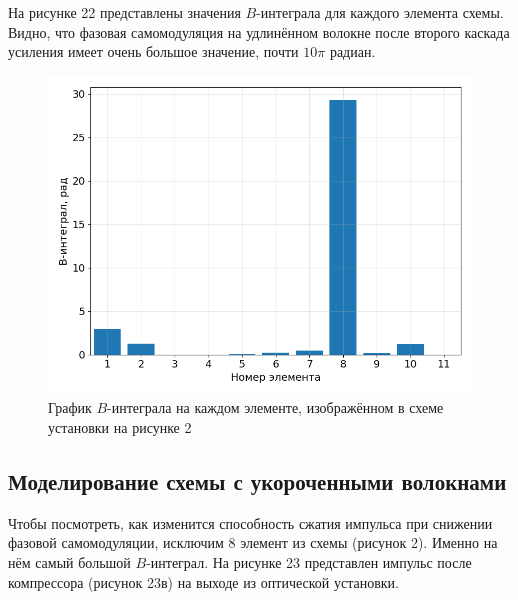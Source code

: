 \documentclass[12pt]{article}
\begin{document}
На рисунке 22 представлены значения $B$-интеграла для каждого элемента схемы. Видно, что фазовая самомодуляция
на удлинённом волокне после второго каскада усиления имеет очень большое значение, почти $10\pi$ радиан.

\begin{figure}[h!]
    \centering
    \begin{minipage}[b]{0.5\textwidth}
        \includegraphics[width=\textwidth]{Images/Gauss Pulse x10/!B интегралы}
    \end{minipage}
    \caption{График $B$-интеграла на каждом элементе, изображённом в схеме установки на рисунке 2}
\end{figure}

\subsection{Моделирование схемы с укороченными волокнами}

Чтобы посмотреть, как изменится способность сжатия импульса при снижении фазовой самомодуляции, исключим 8 элемент
из схемы (рисунок 2). Именно на нём самый большой $B$-интеграл. На рисунке 23 представлен импульс после компрессора
(рисунок 23в) на выходе из оптической установки.
\end{document}
